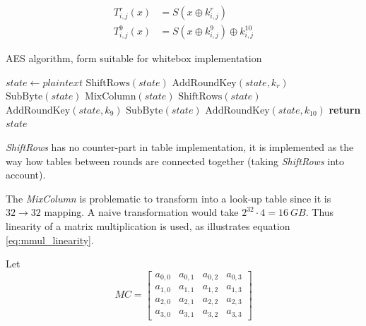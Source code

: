 \documentclass[11pt,oneside,final]{fithesis2}
\begin{document}
    \begin{subequations} \label{eq:tboxes}
    \begin{align}
	T^r_{i,j}(x)    &= S\left(x \oplus k^r_{i,j}\right)\\
	T^{9}_{i,j}(x)  &= S\left(x \oplus k^{9}_{i,j}\right) \oplus k^{10}_{i,j}
    \end{align}
    \end{subequations}

    \begin{algorithm}
        \caption{AES algorithm, form suitable for whitebox implementation}
	\begin{algorithmic}[1]
	      
	    \State $state \gets plaintext$          
		\State $\text{ShiftRows}(state)$
		\State $\text{AddRoundKey}(state, k_{r})$
		\State $\text{SubByte}(state)$
		\State $\text{MixColumn}(state)$
	    \EndFor
	    \State $\text{ShiftRows}(state)$
	    \State $\text{AddRoundKey}(state, k_{9})$
	    \State $\text{SubByte}(state)$
	    \State $\text{AddRoundKey}(state, k_{10})$
	    \State \textbf{return} $state$
	    \EndFunction
	\end{algorithmic}
	\label{alg:AESalg}
    \end{algorithm}

    \emph{ShiftRows} has no counter-part in
    table implementation, it is implemented as the way how tables between rounds are connected together (taking \emph{ShiftRows} into account). 
    
    The \emph{MixColumn} is problematic to transform into a look-up table
    since it is $32 \rightarrow 32$ mapping. A naive transformation would take $2^{32}\cdot4 = 16~GB$. Thus linearity of a matrix multiplication is used, as
    illustrates equation \ref{eq:mmul_linearity}. 
    
    Let 
    \begin{equation}
        MC = \begin{bmatrix} 
	a_{0,0} & a_{0,1} & a_{0,2} & a_{0,3}  \\
	a_{1,0} & a_{1,1} & a_{1,2} & a_{1,3}  \\
	a_{2,0} & a_{2,1} & a_{2,2} & a_{2,3}  \\
	a_{3,0} & a_{3,1} & a_{3,2} & a_{3,3}
     \end{bmatrix} 
     \end{equation}
\end{document}
